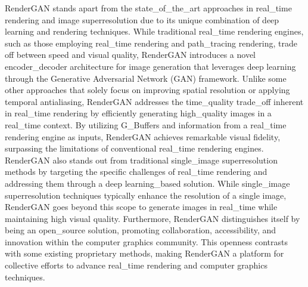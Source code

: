 RenderGAN stands apart from the state_of_the_art approaches in real_time rendering and image superresolution due to its unique combination of deep learning and rendering techniques. While traditional real_time rendering engines, such as those employing real_time rendering and path_tracing rendering, trade off between speed and visual quality, RenderGAN introduces a novel encoder_decoder architecture for image generation that leverages deep learning through the Generative Adversarial Network (GAN) framework. Unlike some other approaches that solely focus on improving spatial resolution or applying temporal antialiasing, RenderGAN addresses the time_quality trade_off inherent in real_time rendering by efficiently generating high_quality images in a real_time context. By utilizing G_Buffers and information from a real_time rendering engine as inputs, RenderGAN achieves remarkable visual fidelity, surpassing the limitations of conventional real_time rendering engines. RenderGAN also stands out from traditional single_image superresolution methods by targeting the specific challenges of real_time rendering and addressing them through a deep learning_based solution. While single_image superresolution techniques typically enhance the resolution of a single image, RenderGAN goes beyond this scope to generate images in real_time while maintaining high visual quality. Furthermore, RenderGAN distinguishes itself by being an open_source solution, promoting collaboration, accessibility, and innovation within the computer graphics community. This openness contrasts with some existing proprietary methods, making RenderGAN a platform for collective efforts to advance real_time rendering and computer graphics techniques.

